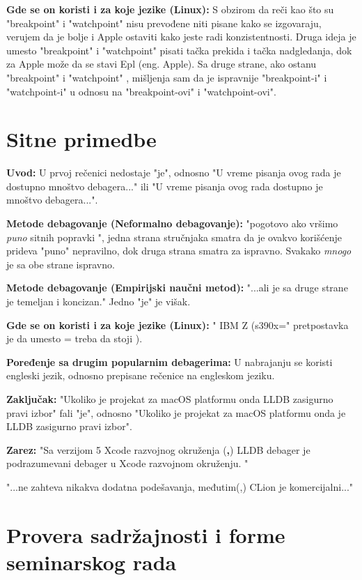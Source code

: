 \documentclass[a4paper]{report}
\begin{document}
\textbf{Gde se on koristi i za koje jezike (Linux):} S obzirom da reči kao što su "breakpoint"{} i "watchpoint"{} nisu prevođene niti pisane kako se izgovaraju, verujem da je bolje i Apple 
ostaviti kako jeste radi konzistentnosti.
Druga ideja je umesto "breakpoint"{} i "watchpoint"{} pisati tačka prekida i tačka nadgledanja, dok za Apple može da se stavi Epl (eng. Apple). Sa druge strane, ako ostanu
"breakpoint"{} i "watchpoint" ,
mišljenja sam da je ispravnije "breakpoint-i"{} i "watchpoint-i"{} u odnosu na "breakpoint-ovi"{} i "watchpoint-ovi".

\section{Sitne primedbe}
\textbf{Uvod:} U prvoj rečenici nedostaje "je", odnosno "U vreme pisanja ovog rada je dostupno mnoštvo debagera..."{} ili "U vreme pisanja ovog rada dostupno je mnoštvo debagera...".

\textbf{Metode debagovanje (Neformalno debagovanje):} "pogotovo ako vršimo \textit{puno} sitnih popravki ", jedna strana stručnjaka smatra da je ovakvo korišćenje prideva
"puno" nepravilno, dok druga strana smatra za ispravno. Svakako \textit{mnogo} je sa obe strane ispravno.

\textbf{Metode debagovanje (Empirijski naučni metod):} "...ali je sa druge strane je temeljan i koncizan." Jedno "je"{} je višak.

\textbf{Gde se on koristi i za koje jezike (Linux):} " IBM Z (s390x="{} pretpostavka je da umesto = treba da stoji ).

\textbf{Poređenje sa drugim popularnim debagerima: } U nabrajanju se koristi engleski jezik, odnosno prepisane rečenice na engleskom jeziku.

\textbf{Zaključak: } "Ukoliko je projekat za macOS platformu onda LLDB zasigurno pravi izbor"{} fali "je", odnosno "Ukoliko je projekat za macOS platformu onda je LLDB zasigurno pravi izbor".


\textbf{Zarez: } "{}Sa verzijom 5 Xcode razvojnog okruženja (\textbf{,}) LLDB debager je podrazumevani debager u Xcode razvojnom okruženju. "

"...ne zahteva nikakva dodatna podešavanja, međutim(,) CLion je komercijalni..."

\section{Provera sadržajnosti i forme seminarskog rada}
\end{document}
